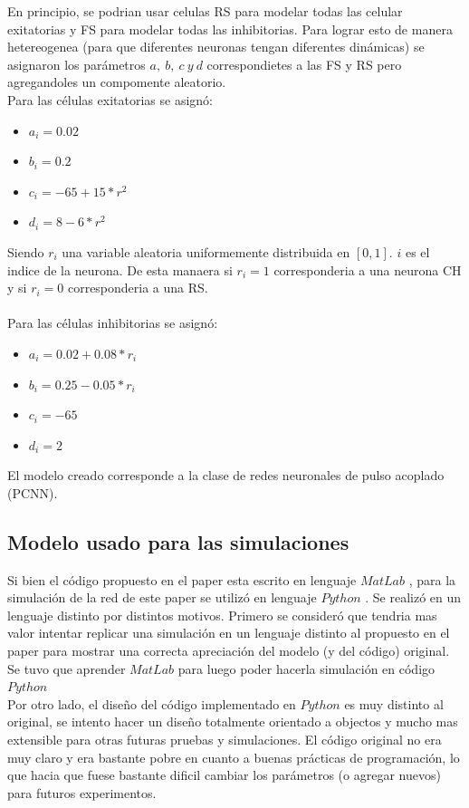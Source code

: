 \documentclass[12pt]{article}
\begin{document}
En principio, se podrian usar celulas RS para modelar todas las celular exitatorias y FS para modelar todas las inhibitorias. Para lograr esto de manera hetereogenea (para que diferentes neuronas tengan diferentes dinámicas)
se asignaron los parámetros $a, \ b, \ c \ y \ d$ correspondietes a las FS y RS pero agregandoles un compomente aleatorio. \\
Para las células exitatorias se asignó:
\begin{itemize}
    \item $a_i = 0.02$
    \item $b_i = 0.2$
    \item $c_i = -65 + 15 * r^2$
    \item $d_i = 8 - 6 * r^2$
\end{itemize}

Siendo $r_i$ una variable aleatoria uniformemente distribuida en $[0,1 ]$. $i$ es el indice de la neurona. De esta manaera si $r_i = 1$ corresponderia a una neurona CH y si $r_i = 0$ corresponderia a una RS.\\
\\
Para las células inhibitorias se asignó:
\begin{itemize}
    \item $a_i = 0.02 + 0.08 * r_i$
    \item $b_i = 0.25 - 0.05 * r_i$
    \item $c_i = -65$
    \item $d_i = 2$
\end{itemize}

El modelo creado corresponde a la clase de redes neuronales de pulso acoplado (PCNN).
\newpage
\subsection{Modelo usado para las simulaciones}
Si bien el código propuesto en el paper esta escrito en lenguaje $MatLab$ \cite{MatLab}, para la simulación de la red de este paper se utilizó en lenguaje $Python$ \cite{Python}.
Se realizó en un lenguaje distinto por distintos motivos. Primero se consideró que tendria mas valor intentar replicar una simulación en un lenguaje distinto al propuesto en el paper
para mostrar una correcta apreciación del modelo (y del código) original. Se tuvo que aprender $MatLab$ para luego poder hacerla simulación en código $Python$ \\
Por otro lado, el diseño del código implementado en $Python$ es muy distinto al original, se intento hacer un diseño totalmente orientado a objectos y mucho mas extensible para otras futuras pruebas y simulaciones.
El código original no era muy claro y era bastante pobre en cuanto a buenas prácticas de programación, lo que hacia que fuese bastante dificil cambiar los parámetros (o agregar nuevos) para futuros experimentos.
\end{document}

